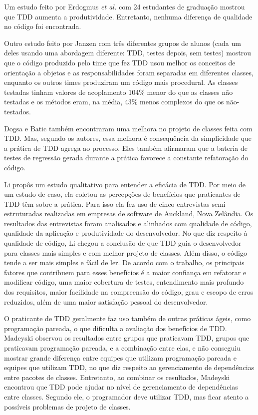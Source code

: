 \documentclass[conference]{IEEEtran}
\begin{document}
Um estudo feito por Erdogmus \textit{et al.} \cite{erdogmus-morisio} com 24 estudantes de
graduação mostrou que TDD aumenta a produtividade. Entretanto, nenhuma diferença 
de qualidade no código foi encontrada.

Outro estudo feito por Janzen \cite{janzen-saiedian} com três diferentes grupos
de alunos (cada um deles usando uma abordagem diferente: TDD, testes depois, sem
testes) mostrou que o código produzido pelo time que fez TDD usou melhor os
conceitos de orientação a objetos e as responsabilidades foram separadas em 
diferentes classes, enquanto os outros times produziram um código mais
procedural. 
As classes testadas tinham valores de acoplamento 104\% menor do 
que as classes não testadas e os métodos eram, na média, 43\% menos complexos 
do que os não-testados.

Dogsa e Batic \cite{dogsa-batic} também encontraram uma melhora no
projeto de classes feita com TDD. Mas, segundo os autores, essa melhora é 
consequência da simplicidade que a prática de TDD agrega ao processo. Eles
também  afirmaram que a bateria de testes de regressão gerada durante a prática 
favorece a constante refatoração do código.

Li \cite{angela-li} propôs um estudo qualitativo para
entender a eficácia de TDD. Por meio de um estudo de caso, ela coletou as 
percepções de benefícios que praticantes de TDD têm sobre a prática. Para isso ela
fez uso de cinco entrevistas semi-estruturadas realizadas em empresas de software de 
Auckland, Nova Zelândia. Os resultados das entrevistas foram analisados e alinhados
com qualidade de código,
qualidade da aplicação e produtividade do desenvolvedor.
No que diz respeito à qualidade de código, Li chegou a conclusão de
que TDD guia o desenvolvedor para classes mais simples e com melhor projeto de classes. 
Além disso, o código tende a ser mais simples e fácil de ler.
De acordo com o trabalho, os principais fatores que contribuem para esses benefícios
é a maior confiança em refatorar e modificar código, uma maior cobertura de testes,
entendimento mais profundo dos requisitos, maior facilidade na compreensão do código,
grau e escopo de erros reduzidos, além de uma maior satisfação pessoal do desenvolvedor.

O praticante de TDD geralmente faz uso também de outras práticas ágeis, como
programação pareada, o que dificulta a avaliação dos benefícios
de TDD. Madeyski \cite{madeyski-package-dependencies} observou os resultados
entre grupos que praticavam TDD, grupos que praticavam programação pareada, 
e a combinação entre elas,
e não conseguiu mostrar grande diferença entre equipes que utilizam programação 
pareada e equipes que utilizam TDD, no que diz respeito ao gerenciamento de dependências entre 
pacotes de classes. Entretanto, ao combinar os resultados, Madeyski encontrou que TDD pode 
ajudar no nível de gerenciamento de dependências entre classes. Segundo ele, o 
programador deve utilizar TDD, mas ficar atento a possíveis problemas de projeto de classes.
\end{document}
